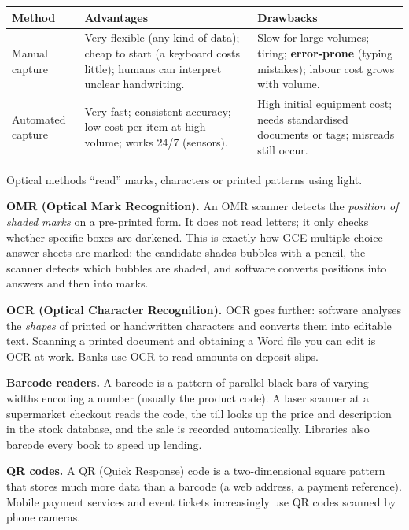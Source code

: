 \documentclass[11pt]{article}
\newcounter{popsec}
\newcounter{popsub}
\newcommand{\courssub}[1]{%
  \stepcounter{popsub}%
  \par\vspace{9pt}\noindent{\popxbold\fontsize{11.5}{13}\selectfont\color{popink}{\color{poporange}\thepopsec.\thepopsub}\hspace{6pt}#1}\par\nopagebreak\vspace{4pt}
}
\begin{document}
\begin{center}
\begin{tabularx}{\linewidth}{|l|X|X|}
\hline
\rowcolor{popblueL} \textbf{Method} & \textbf{Advantages} & \textbf{Drawbacks} \\
\hline
Manual capture & Very flexible (any kind of data); cheap to start (a keyboard costs little); humans can interpret unclear handwriting. & Slow for large volumes; tiring; \textbf{error-prone} (typing mistakes); labour cost grows with volume. \\
\hline
Automated capture & Very fast; consistent accuracy; low cost per item at high volume; works 24/7 (sensors). & High initial equipment cost; needs standardised documents or tags; misreads still occur. \\
\hline
\end{tabularx}
\end{center}

\courssub{Automated Capture --- Optical Methods}

Optical methods ``read'' marks, characters or printed patterns using light.

\textbf{OMR (Optical Mark Recognition).} An OMR scanner detects the \emph{position of shaded marks} on a pre-printed form. It does not read letters; it only checks whether specific boxes are darkened. This is exactly how GCE multiple-choice answer sheets are marked: the candidate shades bubbles with a pencil, the scanner detects which bubbles are shaded, and software converts positions into answers and then into marks.

\textbf{OCR (Optical Character Recognition).} OCR goes further: software analyses the \emph{shapes} of printed or handwritten characters and converts them into editable text. Scanning a printed document and obtaining a Word file you can edit is OCR at work. Banks use OCR to read amounts on deposit slips.

\textbf{Barcode readers.} A barcode is a pattern of parallel black bars of varying widths encoding a number (usually the product code). A laser scanner at a supermarket checkout reads the code, the till looks up the price and description in the stock database, and the sale is recorded automatically. Libraries also barcode every book to speed up lending.

\textbf{QR codes.} A QR (Quick Response) code is a two-dimensional square pattern that stores much more data than a barcode (a web address, a payment reference). Mobile payment services and event tickets increasingly use QR codes scanned by phone cameras.
\end{document}
